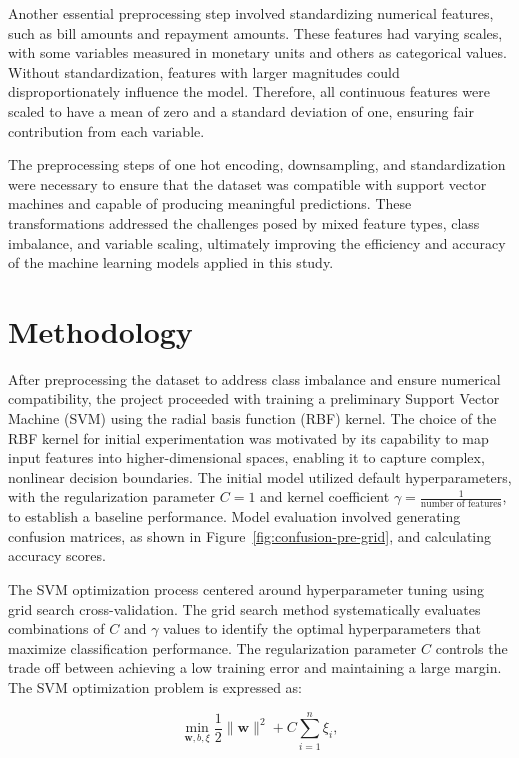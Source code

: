 \documentclass{article}
\begin{document}
Another essential preprocessing step involved standardizing numerical features, such as bill amounts and repayment amounts. These features had varying scales, with some variables measured in monetary units and others as categorical values. 
Without standardization, features with larger magnitudes could disproportionately influence the model. Therefore, all continuous features were scaled to have a mean of zero and a standard deviation of one, ensuring fair contribution from each variable.

The preprocessing steps of one hot encoding, downsampling, and standardization were necessary to ensure that the dataset was compatible with support vector machines and capable of producing meaningful predictions. 
These transformations addressed the challenges posed by mixed feature types, class imbalance, and variable scaling, ultimately improving the efficiency and accuracy of the machine learning models applied in this study.


\section{Methodology}
After preprocessing the dataset to address class imbalance and ensure numerical compatibility, the project proceeded with training a preliminary Support Vector Machine (SVM) using the radial basis function (RBF) kernel. 
The choice of the RBF kernel for initial experimentation was motivated by its capability to map input features into higher-dimensional spaces, enabling it to capture complex, nonlinear decision boundaries. 
The initial model utilized default hyperparameters, with the regularization parameter \(C = 1\) and kernel coefficient \(\gamma = \frac{1}{\text{number of features}}\), to establish a baseline performance. 
Model evaluation involved generating confusion matrices, as shown in Figure~\ref{fig:confusion-pre-grid}, and calculating accuracy scores.

The SVM optimization process centered around hyperparameter tuning using grid search cross-validation. The grid search method systematically evaluates combinations of \(C\) and \(\gamma\) values to identify the optimal 
hyperparameters that maximize classification performance. The regularization parameter \(C\) controls the trade off between achieving a low training error and maintaining a large margin. The SVM optimization problem is expressed as:

\[
\min_{\mathbf{w}, b, \xi} \frac{1}{2} \|\mathbf{w}\|^2 + C \sum_{i=1}^n \xi_i,
\]
\end{document}
